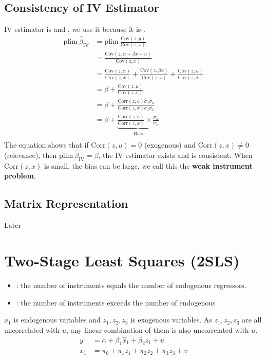 \subsection*{Consistency of IV Estimator}
IV estimator is  and , we use it because it is .
\begin{align*}
    \textrm{plim} \ \hat{\beta}_{\text{IV}} &= \mathrm{plim} \ \frac{\mathrm{Cov}(z, y)}{\mathrm{Cov}(z, x)} \\
    &= \frac{\mathrm{Cov}(z, \alpha + \beta x + u)}{\mathrm{Cov}(z, x)} \\
    &= \frac{\mathrm{Cov}(z, \alpha)}{\mathrm{Cov}(z, x)} + \frac{\mathrm{Cov}(z, \beta x)}{\mathrm{Cov}(z, x)}+ \frac{\mathrm{Cov}(z, u)}{\mathrm{Cov}(z, x)} \\
    &= \beta + \frac{\mathrm{Cov}(z, u)}{\mathrm{Cov}(z, x)} \\
    &= \beta + \frac{\mathrm{Corr}(z, u) \sigma_z \sigma_u}{\mathrm{Corr}(z, x) \sigma_z \sigma_x} \\
    &= \beta + \underbrace{\frac{\mathrm{Corr}(z, u)}{\mathrm{Corr}(z, x)} \times \frac{\sigma_u}{\sigma_x}}_{\text{Bias}} \\
\end{align*}
The equation shows that if \( \mathrm{Corr}(z, u) = 0 \) (exogenous) and \( \mathrm{Corr}(z, x) \neq 0 \) (relevance), then \( \mathrm{plim} \ \hat{\beta}_{\text{IV}} = \beta \), the IV estimator exists and is consistent.
When \( \mathrm{Corr}(z, x) \) is small, the bias can be large, we call this the \textbf{weak instrument problem}. 

\subsection*{Matrix Representation}
Later


\section{Two-Stage Least Squares (2SLS)}

\begin{itemize}
    \item {}: the number of instruments equals the number of endogenous regressors.
    \item {}: the number of instruments exceeds the number of endogenous
\end{itemize}

\( x_1 \) is endogenous variables and \( z_1, z_2, z_3 \) is exogenous variables.
As \( z_1, z_2, z_3 \) are all uncorrelated with \( u \), any linear combination of them is also uncorrelated with \( u \).
\begin{align*}
    y &= \alpha + \beta_1 \hat{x}_1 + \beta_2 z_1 + u \\
    x_1 &= \pi_0 + \pi_1 z_1 + \pi_2 z_2 + \pi_3 z_3 + v
\end{align*}

